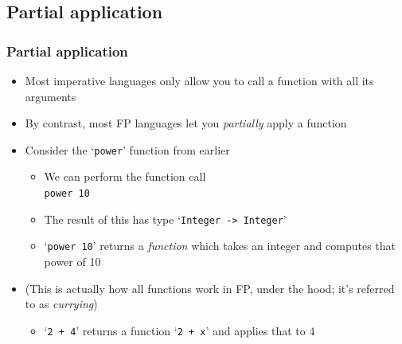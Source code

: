\documentclass{beamer}
\begin{document}
  \subsection{Partial application}
  \begin{frame}[fragile]
    \frametitle{Partial application}

    \begin{itemize}
      \item Most imperative languages only allow you to call a function with all
            its arguments
      \item By contrast, most FP languages let you \textit{partially} apply a
            function
      \item Consider the `\texttt{power}' function from earlier
        \begin{itemize}
          \item We can perform the function call\\
                \texttt{power 10}
          \item The result of this has type `\texttt{Integer -> Integer}'
          \item `\texttt{power 10}' returns a \textit{function} which takes an
                integer and computes that power of 10
        \end{itemize}
      \item (This is actually how all functions work in FP, under the hood; it's
            referred to as \textit{currying})
        \begin{itemize}
          \item `\texttt{2 + 4}' returns a function `\texttt{2 + x}' and applies
                that to 4
        \end{itemize}
    \end{itemize}
  \end{frame}
\end{document}
